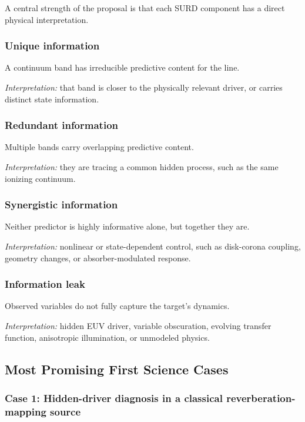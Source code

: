 \documentclass{article}
\begin{document}
A central strength of the proposal is that each SURD component has a direct physical interpretation.

\subsubsection{Unique information}

A continuum band has irreducible predictive content for the line.

\textit{Interpretation:} that band is closer to the physically relevant driver, or carries distinct state information.

\subsubsection{Redundant information}

Multiple bands carry overlapping predictive content.

\textit{Interpretation:} they are tracing a common hidden process, such as the same ionizing continuum.

\subsubsection{Synergistic information}

Neither predictor is highly informative alone, but together they are.

\textit{Interpretation:} nonlinear or state-dependent control, such as disk-corona coupling, geometry changes, or absorber-modulated response.

\subsubsection{Information leak}

Observed variables do not fully capture the target's dynamics.

\textit{Interpretation:} hidden EUV driver, variable obscuration, evolving transfer function, anisotropic illumination, or unmodeled physics.

\subsection{Most Promising First Science Cases}

\subsubsection{Case 1: Hidden-driver diagnosis in a classical reverberation-mapping source}
\end{document}
